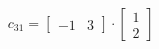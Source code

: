 \documentclass[preview]{standalone}
\begin{document}
\begin{align*}
c_{31} = \begin{bmatrix} -1 & 3 \end{bmatrix} \cdot \begin{bmatrix} 1 \\ 2 \end{bmatrix}
\end{align*}
\end{document}

